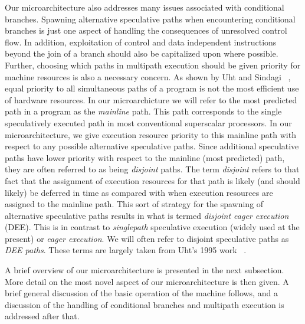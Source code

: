 \documentclass[10pt,dvips]{article}
\begin{document}
Our microarchitecture also 
addresses many issues associated with conditional branches.
Spawning alternative speculative paths when encountering conditional
branches is just one aspect of handling the consequences of
unresolved control flow.
In addition, exploitation of control
and data independent instructions beyond the join of a branch should
also be capitalized upon where possible.
Further, choosing which paths in multipath execution should
be given priority for machine resources is also a necessary concern.
As shown by Uht and Sindagi ~\cite{Uht95},
equal priority to all simultaneous paths
of a program is not the most efficient use of hardware resources.
In our microarchicture we will refer to the most predicted path
in a program as the 
\textit{mainline} path.  
This path corresponds to the single speculatively
executed path in most conventional superscalar processors.
In our microarchitecture,
we give execution resource priority to this mainline path with respect
to any possible alternative speculative paths.  
Since additional speculative paths have lower priority with
respect to the mainline (most predicted) path, they are often referred
to as being
\textit{disjoint} paths.  
The term \textit{disjoint} refers to that fact that the assignment
of execution resources for that path is likely (and should likely) be
deferred in time
as compared with when execution resources are assigned to the mainline
path.  This sort of strategy for the spawning of alternative speculative
paths results in what is termed \textit{disjoint eager execution} (DEE).
This is in contrast to \textit{singlepath} speculative execution
(widely used at the present)
or \textit{eager execution}.
We will often refer to disjoint speculative paths as \textit{DEE paths}.
These terms are largely taken from Uht's 1995 work ~\cite{Uht95}.

A brief overview of our microarchitecture is presented in the next
subsection.  
More detail on the most novel aspect of our microarchitecture
is then given.
A brief general discussion of the basic operation
of the machine follows, and a discussion of the handling
of conditional branches and multipath execution is addressed after that.
%
\end{document}
